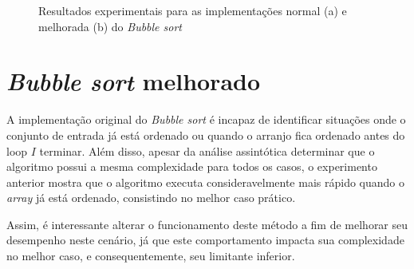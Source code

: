 \documentclass[12pt]{article}
\begin{document}
\begin{figure}[h]%
    \caption{Resultados experimentais para as implementações normal (a) e melhorada (b) do \textit{Bubble sort}}%
    \label{fig:bubble}%
\end{figure}

\section{\textit{Bubble sort} melhorado}

A implementação original do \textit{Bubble sort} é incapaz de identificar situações onde o conjunto de entrada já está ordenado ou quando o arranjo fica ordenado antes do loop $I$ terminar. Além disso, apesar da análise assintótica determinar que o algoritmo possui a mesma complexidade para todos os casos, o experimento anterior mostra que o algoritmo executa consideravelmente mais rápido quando o \textit{array} já está ordenado, consistindo no melhor caso prático.

Assim, é interessante alterar o funcionamento deste método a fim de melhorar seu desempenho neste cenário, já que este comportamento impacta sua complexidade no melhor caso, e consequentemente, seu limitante inferior.
\end{document}

